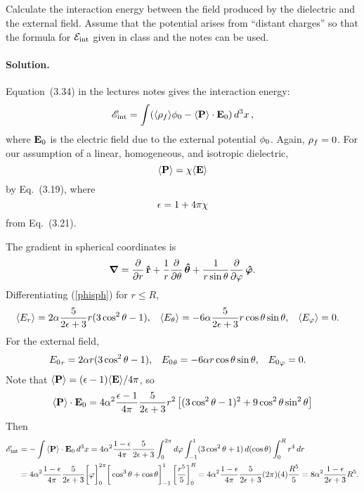 \documentclass[11pt]{article}
\newcommand{\vfix}{\vspace{-\baselineskip}}
\newcommand{\refeq}[1]{(\ref{#1})}
\newcommand{\beq}{\begin{equation*}}
\newcommand{\eeq}{\end{equation*}}
\newcommand{\beqn}{\begin{equation}}
\newcommand{\eeqn}{\end{equation}}
\newenvironment{problem}
{
	\subsection{}
	\color{darkgray}
    \ignorespaces
}
{

}
\newenvironment{solution}
{
    \paragraph{Solution.}
    \ignorespaces
}
{
    \bigskip
}
\begin{document}
\newcommand{\sE}{\mathscr{E}}
\newcommand{\sEint}{\sE_\text{int}}
\newcommand{\vEo}{\vE_0}
\newcommand{\dcx}{\dd[3]{x}}
\newcommand{\rh}{\vb{\hat{r}}}
\newcommand{\thh}{\boldsymbol{\hat{\tht}}}
\newcommand{\phh}{\boldsymbol{\hat{\vph}}}
\newcommand{\sint}{\sin\tht}
\newcommand{\Eth}{E_\tht}
\newcommand{\Eph}{E_\vph}
\newcommand{\evEth}{\ev{\Eth}}
\newcommand{\evEph}{\ev{\Eph}}
\newcommand{\Eo}{E_0}
\newcommand{\Eor}{{\Eo}_r}
\newcommand{\Eoth}{{\Eo}_\tht}
\newcommand{\Eoph}{{\Eo}_\vph}

\newcommand{\evPr}{\ev{P_r}}
\newcommand{\evPth}{\ev{P_\tht}}
\newcommand{\evPph}{\ev{P_\vph}}
\newcommand{\dph}{\dd{\vph}}
\newcommand{\dct}{\dd{(\cost)}}
\newcommand{\dr}{\dd{r}}
\newcommand{\intRi}{\int_R^\infty}

\begin{problem}
	Calculate the interaction energy between the field produced by the dielectric and the external field.  Assume that the potential arises from ``distant charges'' so that the formula for $\mathcal{E}_\text{int}$ given in class and the notes can be used.
\end{problem}

\begin{solution}
	Equation~(3.34) in the lectures notes gives the interaction energy:
	\beq
		\sEint = \int (\evrhof \!\phio - \evP \cdot \vEo) \dcx,
	\eeq
	where $\vEo$ is the electric field due to the external potential $\phi_0$.  Again, $\rho_f = 0$.  For our assumption of a linear, homogeneous, and isotropic dielectric,
	\beq
		\evP = \chi \!\evE
	\eeq
	by Eq.~(3.19), where
	\beq
		\eps = 1 + 4\pi \chi
	\eeq
	from Eq.~(3.21).
	
	The gradient in spherical coordinates is
	\beqn \label{grad}
		\grad = \pdv{}{r} \,\rh + \frac{1}{r} \pdv{}{\tht} \,\thh + \frac{1}{r \sint} \pdv{}{\vph} \, \phh.
	\eeqn
	Differentiating \refeq{phisph} for $r \leq R$,
	\begin{align} \label{Ein}
		\evEr &= 2 \alp \frac{5}{2\eps + 3} r (3 \cos^2\tht - 1), &
		\evEth &= -6 \alp \frac{5}{2\eps + 3} r \cost \sint, &
		\evEph &= 0.
	\end{align}
	For the external field,
	\begin{align} \label{E0}
		\Eor &= 2 \alp r (3 \cos^2\tht - 1), &
		\Eoth &= -6 \alp r \cost \sint, &
		\Eoph &= 0.
	\end{align}
	Note that $\evP = (\eps - 1) \!\evE\! / 4 \pi$, so
	\beq
		\evP \cdot \vEo = 4 \alp^2 \frac{\eps - 1}{4\pi} \frac{5}{2\eps + 3} r^2 \left[ (3 \cos^2\tht - 1)^2 + 9 \cos^2\tht \sin^2\tht \right]
	\eeq
	Then
	\begin{align*}
		\sEint &= -\int \evP \cdot \vEo \dcx
		= 4 \alp^2 \frac{1 - \eps}{4\pi} \frac{5}{2\eps + 3} \intotp \dph \intono (3 \cos^2\tht + 1) \dct \intoR r^4 \dr \\
		&= 4 \alp^2 \frac{1 - \eps}{4\pi} \frac{5}{2\eps + 3} \bigg[ \vph \bigg]_0^{2\pi} \bigg[ \cos^3\tht + \cost \bigg]_{-1}^1 \left[ \frac{r^5}{5} \right]_0^R
		= 4 \alp^2 \frac{1 - \eps}{4\pi} \frac{5}{2\eps + 3} (2\pi) (4) \frac{R^5}{5}
		= 8 \alp^2 \frac{1 - \eps}{2\eps + 3} R^5.
	\end{align*}
\end{solution}
\vfix
\end{document}
